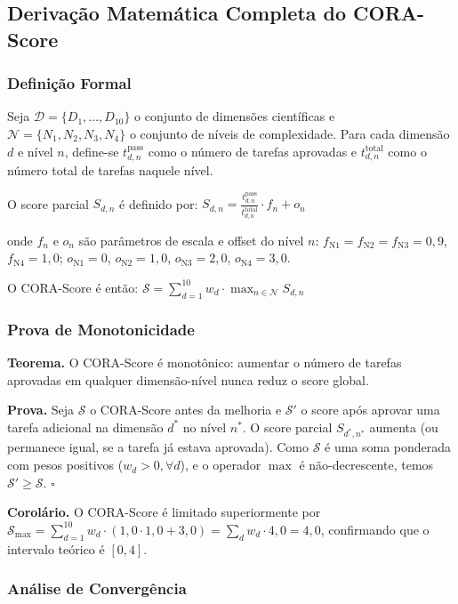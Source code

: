 \subsection{Derivação Matemática Completa do CORA-Score}

\subsubsection{Definição Formal}

Seja $\mathcal{D} = \{D_1, \ldots, D_{10}\}$ o conjunto de dimensões
científicas e $\mathcal{N} = \{N_1, N_2, N_3, N_4\}$ o conjunto de níveis de
complexidade. Para cada dimensão $d$ e nível $n$, define-se $t_{d,n}^{\text{pass}}$
como o número de tarefas aprovadas e $t_{d,n}^{\text{total}}$ como o número
total de tarefas naquele nível.

O score parcial $S_{d,n}$ é definido por:
$S_{d,n} = \frac{t_{d,n}^{\text{pass}}}{t_{d,n}^{\text{total}}} \cdot f_n + o_n$

onde $f_n$ e $o_n$ são parâmetros de escala e offset do nível $n$:
$f_{\text{N1}} = f_{\text{N2}} = f_{\text{N3}} = 0,9$, $f_{\text{N4}} = 1,0$;
$o_{\text{N1}} = 0$, $o_{\text{N2}} = 1,0$, $o_{\text{N3}} = 2,0$,
$o_{\text{N4}} = 3,0$.

O CORA-Score é então: $\mathcal{S} = \sum_{d=1}^{10} w_d \cdot
\max_{n \in \mathcal{N}} S_{d,n}$

\subsubsection{Prova de Monotonicidade}

\textbf{Teorema.} O CORA-Score é monotônico: aumentar o número de tarefas
aprovadas em qualquer dimensão-nível nunca reduz o score global.

\textbf{Prova.} Seja $\mathcal{S}$ o CORA-Score antes da melhoria e
$\mathcal{S}'$ o score após aprovar uma tarefa adicional na dimensão $d^*$
no nível $n^*$. O score parcial $S_{d^*,n^*}$ aumenta (ou permanece igual,
se a tarefa já estava aprovada). Como $\mathcal{S}$ é uma soma ponderada com
pesos positivos ($w_d > 0, \forall d$), e o operador $\max$ é não-decrescente,
temos $\mathcal{S}' \geq \mathcal{S}$. $\square$

\textbf{Corolário.} O CORA-Score é limitado superiormente por
$\mathcal{S}_{\max} = \sum_{d=1}^{10} w_d \cdot (1,0 \cdot 1,0 + 3,0) =
\sum_d w_d \cdot 4,0 = 4,0$, confirmando que o intervalo teórico é $[0, 4]$.

\subsubsection{Análise de Convergência}

